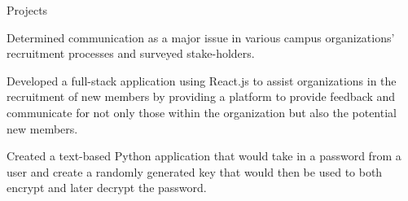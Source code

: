 \documentclass{resume} %
\begin{document}


\begin{workSection}{Projects}
     \customItem[
        title=RushKit,
        duration=July 2022 – Present,
        keyHighlight=Recruitment Web Application,
        location=Atlanta{,} GA
     ]
     \begin{bullets}
        \item Determined communication as a major issue in various campus organizations' recruitment processes and surveyed stake-holders.
        \item Developed a full-stack application using React.js to assist organizations in the recruitment of new members by providing a platform to provide feedback and communicate for not only those within the organization but also the potential new members.
     \end{bullets}

     \customItem[
        title=Encryption Project,
        duration=February 2020 - April 2020,
        keyHighlight=Python Script,
        location=Atlanta{,} GA
     ]
     \begin{bullets}
        \item Created a text-based Python application that would take in a password from a user and create a randomly generated key that would then be used to both encrypt and later decrypt the password.

     \end{bullets}
\end{workSection}

\end{document}
